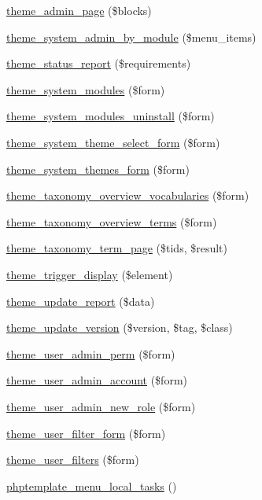 \begin{CompactItemize}
\item 
\hyperlink{group__themeable_g397a84152a61e9517d530d8f8a2507ee}{theme\_\-admin\_\-page} (\$blocks)
\item 
\hyperlink{group__themeable_gf89acb33020a2b0dd55d410ce725ecb8}{theme\_\-system\_\-admin\_\-by\_\-module} (\$menu\_\-items)
\item 
\hyperlink{group__themeable_g4ce2716a6dfd16ef7190bcbb797dd0eb}{theme\_\-status\_\-report} (\$requirements)
\item 
\hyperlink{group__themeable_gdb0103cb92abf4193ad367528d1d060a}{theme\_\-system\_\-modules} (\$form)
\item 
\hyperlink{group__themeable_g662b8055bb00efdbfc372a42fb967ac6}{theme\_\-system\_\-modules\_\-uninstall} (\$form)
\item 
\hyperlink{group__themeable_gf0fc0dd74af2e379fa3509f7d06c4ecf}{theme\_\-system\_\-theme\_\-select\_\-form} (\$form)
\item 
\hyperlink{group__themeable_ga544bfd98c5a8b7e136fae3fd71207bc}{theme\_\-system\_\-themes\_\-form} (\$form)
\item 
\hyperlink{group__themeable_gc13e7fb950bcb43c38a2bf373d5ea348}{theme\_\-taxonomy\_\-overview\_\-vocabularies} (\$form)
\item 
\hyperlink{group__themeable_ga6eed299548007f120519d1e353b811f}{theme\_\-taxonomy\_\-overview\_\-terms} (\$form)
\item 
\hyperlink{group__themeable_g75a8915bc5bf8c1f69d1b5956761608e}{theme\_\-taxonomy\_\-term\_\-page} (\$tids, \$result)
\item 
\hyperlink{group__themeable_g291ceb7284cc7baf7dcf551a9cedec24}{theme\_\-trigger\_\-display} (\$element)
\item 
\hyperlink{group__themeable_gc4985959e9c84378884ce60282b6eca2}{theme\_\-update\_\-report} (\$data)
\item 
\hyperlink{group__themeable_g24a724467a0b23d3672b3a253be3695f}{theme\_\-update\_\-version} (\$version, \$tag, \$class)
\item 
\hyperlink{group__themeable_gf699cde524801368ec966785c8dfc0ee}{theme\_\-user\_\-admin\_\-perm} (\$form)
\item 
\hyperlink{group__themeable_g637d49c0b74dae1daf92d089b4dbed58}{theme\_\-user\_\-admin\_\-account} (\$form)
\item 
\hyperlink{group__themeable_g5bd193ccf822945c67e66021b0f2df9d}{theme\_\-user\_\-admin\_\-new\_\-role} (\$form)
\item 
\hyperlink{group__themeable_g1efb227ccf11a707c5f8ebb2443ba4ee}{theme\_\-user\_\-filter\_\-form} (\$form)
\item 
\hyperlink{group__themeable_gcd04cb8ff61ecb42564cf48635cf61a9}{theme\_\-user\_\-filters} (\$form)
\item 
\hyperlink{group__themeable_g54599947b2e2792844f0d74846791a55}{phptemplate\_\-menu\_\-local\_\-tasks} ()
\end{CompactItemize}
